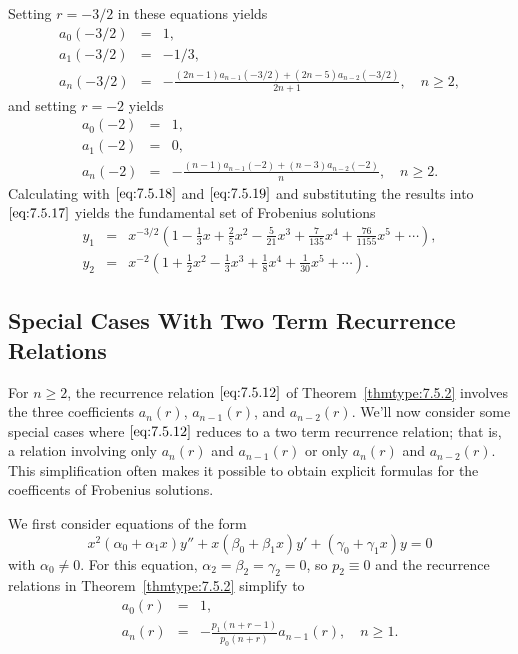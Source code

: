 \documentclass{ximera}
\begin{document}
\begin{example}
\begin{explanation}
Setting $r=-3/2$ in these equations yields
\begin{equation} \label{eq:7.5.18}
\begin{array}{ccl}
a_0(-3/2)&=&1,\\
a_1(-3/2)&=&-1/3,\\
a_n(-3/2)&=&-\frac{(2n-1)a_{n-1}(-3/2)+
(2n-5)a_{n-2}(-3/2)}{2n+1},\quad n\geq2,
\end{array}
\end{equation}
and setting $r=-2$ yields
\begin{equation} \label{eq:7.5.19}
\begin{array}{ccl}
a_0(-2)&=&1,\\
a_1(-2)&=&0,\\
a_n(-2)&=&-\frac{(n-1)a_{n-1}(-2)+(n-3)a_{n-2}(-2)}{n},\quad n\geq2.
\end{array}
\end{equation}
Calculating  with  $\eqref{eq:7.5.18}$ and
$\eqref{eq:7.5.19}$  and substituting the results into
$\eqref{eq:7.5.17}$ yields the fundamental set of  Frobenius
solutions
\begin{eqnarray*}
y_1&=&x^{-3/2}\left(1-\frac{1}{3}x+\frac{2}{5}x^2-\frac{5}{21}x^3
+\frac{7}{135}x^4+\frac{76}{1155}x^5+\cdots\right),\\
y_2&=&x^{-2}\left(1+\frac{1}{2}x^2-\frac{1}{3}x^3+\frac{1}{8}x^4+\frac{1}{30}x^5
+\cdots\right).
\end{eqnarray*}
\end{explanation}
\end{example}

\subsection*{Special Cases With Two Term Recurrence Relations}

For $n\geq2$, the recurrence relation $\eqref{eq:7.5.12}$ of
Theorem~\ref{thmtype:7.5.2} involves the three coefficients
$a_n(r)$, $a_{n-1}(r)$, and $a_{n-2}(r)$. We'll now consider some
special cases where $\eqref{eq:7.5.12}$ reduces to a two term recurrence relation; that is, a relation involving only $a_n(r)$ and $a_{n-1}(r)$
or only $a_n(r)$ and $a_{n-2}(r)$. This simplification often makes it
possible to obtain explicit formulas for the coefficents of Frobenius
solutions.

We first consider equations of the form
$$
x^2(\alpha_0+\alpha_1x)y''+x(\beta_0+\beta_1x)y'+(\gamma_0+\gamma_1x)y=0
$$
with $\alpha_0\neq 0$. For this equation,
$\alpha_2=\beta_2=\gamma_2=0$, so $p_2\equiv0$ and the recurrence
relations in Theorem~\ref{thmtype:7.5.2} simplify to
\begin{equation} \label{eq:7.5.20}
\begin{array}{ccl}
a_0(r)&=&1,\\
a_n(r)&=&-\frac{p_1(n+r-1)}{p_0(n+r)}a_{n-1}(r),\quad n\geq1.
\end{array}
\end{equation}
\end{document}
